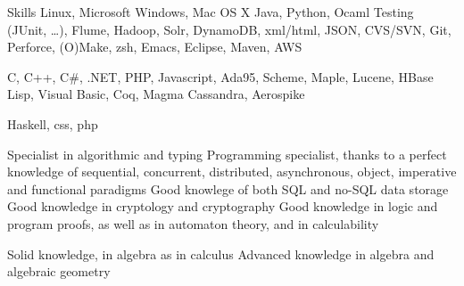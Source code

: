 \begin{rubric}{\color{ForestGreen} Skills}
  \entry*[Expert]
  Linux, Microsoft Windows, Mac OS X
  \entry*
  Java, Python, Ocaml
  \entry* Testing (JUnit, \ldots), Flume, Hadoop, Solr, DynamoDB, xml/html, JSON, \LaTeXe
  \entry*
  CVS/SVN, Git, Perforce, (O)Make, zsh, Emacs, Eclipse, Maven, AWS

  \entry*[Mastered]
  C, C++, C$\#$, .NET, PHP, Javascript, Ada95, Scheme, Maple, Lucene, HBase
  \entry*
  Lisp, Visual Basic, Coq, Magma
  \entry* Cassandra, Aerospike

  \entry*[Notions]
  Haskell, css, php

  \entry*
  Specialist in algorithmic and typing
  \entry*
  Programming specialist, thanks to a perfect knowledge of sequential,
  concurrent, distributed, asynchronous, object, imperative
  and functional paradigms
  \entry* Good knowlege of both SQL and no-SQL data storage
  \entry*
  Good knowledge in cryptology and cryptography
  \entry*
  Good knowledge in logic and program proofs, as well as in automaton theory, and in calculability

  \entry* Solid knowledge, in algebra as in calculus
  \entry* Advanced knowledge in algebra and algebraic geometry
\end{rubric}
